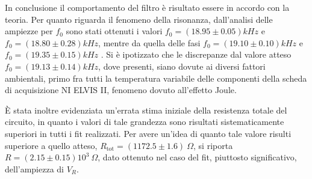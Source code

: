 

In conclusione il comportamento del filtro è risultato essere in accordo con la teoria.
Per quanto riguarda il fenomeno della risonanza, dall'analisi delle ampiezze per $f_0$ sono stati
ottenuti i valori $f_0 = (18.95 \pm 0.05) kHz$ e $f_0 = (18.80 \pm 0.28)kHz$, mentre
da quella delle fasi $f_0 = (19.10 \pm 0.10)kHz$ e $f_0 = (19.35 \pm 0.15)kHz$ .
Si è ipotizzato che le discrepanze dal valore atteso  $f_0 = (19.13 \pm 0.14) kHz$, dove presenti, siano dovute ai diversi fattori ambientali, primo fra tutti la temperatura
variabile delle componenti della scheda di acquisizione NI ELVIS II, fenomeno dovuto all’effetto Joule.

È stata inoltre evidenziata un'errata stima iniziale della resistenza totale del circuito, in quanto i valori di tale
grandezza sono risultati sistematicamente superiori in tutti i fit realizzati.
Per avere un'idea di quanto tale valore risulti superiore a quello atteso, $R_{\text{tot}} = (1172.5 \pm 1.6) \ \Omega$, si riporta
$R =( 2.15 \pm 0.15 )10^3 \ \Omega$, dato ottenuto nel caso del fit, piuttosto significativo, dell'ampiezza di $V_R$.
